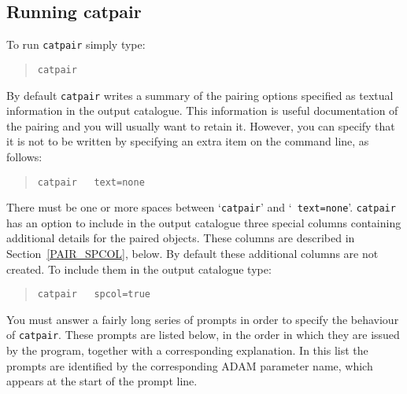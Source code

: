 \documentclass[twoside,11pt]{article}
\renewcommand{\_}{\texttt{\symbol{95}}}
\begin{document}
\subsection{Running catpair}

To run {\tt catpair} simply type:

\begin{verse}
{\tt catpair}
\end{verse}

By default {\tt catpair} writes a summary of the pairing options
specified as textual information in the output catalogue.  This
information is useful documentation of the pairing and you will
usually want to retain it.  However, you can specify that it is not to
be written by specifying an extra item on the command line, as follows:

\begin{verse}
{\tt catpair ~ text=none}
\end{verse}

There must be one or more spaces between `{\tt catpair}' and `{\tt
text=none}'.  {\tt catpair} has an option to include in the output
catalogue three special columns containing additional details for the
paired objects.  These columns are described in Section~\ref{PAIR_SPCOL},
below.  By default these additional columns are not created.  To include
them in the output catalogue type:

\begin{verse}
{\tt catpair ~ spcol=true}
\end{verse}

You must answer a fairly long series of prompts in order to
specify the behaviour of {\tt catpair}. These prompts are listed below,
in the order in which they are issued by the program, together with a
corresponding explanation. In this list the prompts are identified
by the corresponding ADAM parameter name, which appears at the start
of the prompt line.
\end{document}
